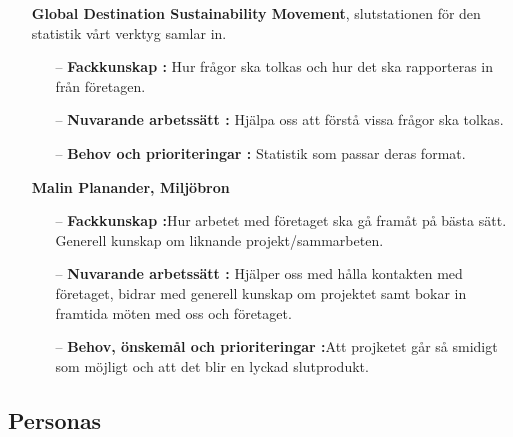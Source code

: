 \documentclass{article}
\begin{document}
\begin{itemize}
\begin{itemize}
                \item [] \textbf{Global Destination Sustainability Movement}, slutstationen för den statistik vårt verktyg samlar in.
                    \begin{itemize}
                        \item[--] \textbf{Fackkunskap :} Hur frågor ska tolkas och hur det ska rapporteras in från företagen.
                        \\
                        \item[--] \textbf{Nuvarande arbetssätt :} Hjälpa oss att förstå vissa frågor ska tolkas.
                        \\
                        \item[--] \textbf{Behov och prioriteringar :} Statistik som passar deras format.
                        \\
                    \end{itemize}
                    
                     \item [] \textbf{Malin Planander, Miljöbron}
                    \begin{itemize}
                        \item[--] \textbf{Fackkunskap :}Hur arbetet med företaget ska gå framåt på bästa sätt. Generell kunskap om liknande projekt/sammarbeten.
                        \\
                        \item[--] \textbf{Nuvarande arbetssätt :} Hjälper oss med hålla kontakten med företaget, bidrar med generell kunskap om projektet samt bokar in framtida möten med oss och företaget.
                        \\
                        \item[--] \textbf{Behov, önskemål och prioriteringar :}Att projketet går så smidigt som möjligt och att det blir en lyckad slutprodukt.
                        
                    \end{itemize}
            \end{itemize}
              
        \subsection{Personas}
        

\end{itemize}
\end{document}
